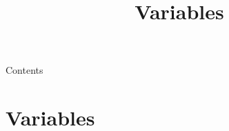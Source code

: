 
\newcommand{\topic}{
	Variables
}

\title{\topic}
\supertitle{\course}
\date{}



\maketitle

\begin{frame}{Contents}
	\tableofcontents
\end{frame}

\section{Variables}
\subsection{}

